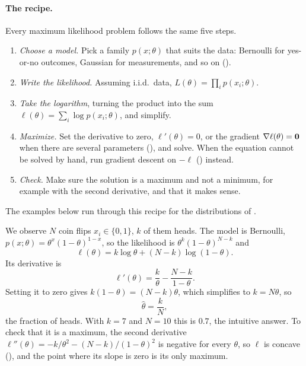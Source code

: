 \paragraph{The recipe.}
Every maximum likelihood problem follows the same five steps.
\begin{enumerate}
  \item \emph{Choose a model.} Pick a family $p(x; \theta)$ that suits the
    data: Bernoulli for yes-or-no outcomes, Gaussian for measurements,
    and so on ().
  \item \emph{Write the likelihood.} Assuming i.i.d.\ data, $L(\theta) =
    \prod_i p(x_i; \theta)$.
  \item \emph{Take the logarithm}, turning the product into the sum
    $\ell(\theta) = \sum_i \log p(x_i; \theta)$, and simplify.
  \item \emph{Maximize.} Set the derivative to zero, $\ell'(\theta) = 0$,
    or the gradient $\nabla \ell(\theta) = \bm{0}$ when there are several
    parameters (), and solve. When the equation
    cannot be solved by hand, run gradient descent on $-\ell$
    () instead.
  \item \emph{Check.} Make sure the solution is a maximum and not a
    minimum, for example with the second derivative, and that it makes
    sense.
\end{enumerate}
The examples below run through this recipe for the distributions of
.

\begin{example}[Bernoulli]
  \label{ex:ch06-mle-bernoulli}
  We observe $N$ coin flips $x_i \in \{0, 1\}$, $k$ of them heads. The
  model is Bernoulli, $p(x; \theta) = \theta^x (1 - \theta)^{1 - x}$, so
  the likelihood is $\theta^k (1 - \theta)^{N - k}$ and
  \[
    \ell(\theta) = k \log\theta + (N - k) \log(1 - \theta) .
  \]
  Its derivative is
  \[
    \ell'(\theta) = \frac{k}{\theta} - \frac{N - k}{1 - \theta} .
  \]
  Setting it to zero gives $k(1 - \theta) = (N - k)\theta$, which
  simplifies to $k = N\theta$, so
  \[
    \hat\theta = \frac{k}{N} ,
  \]
  the fraction of heads. With $k = 7$ and $N = 10$ this is $0.7$, the
  intuitive answer. To check that it is a maximum, the second derivative
  $\ell''(\theta) = -k/\theta^2 - (N - k)/(1 - \theta)^2$ is negative for
  every $\theta$, so $\ell$ is concave (), and the
  point where its slope is zero is its only maximum.
\end{example}

